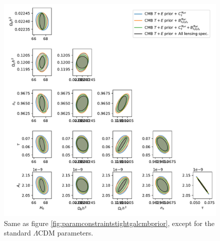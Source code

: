 \documentclass[11pt]{article} %
\begin{document}
\begin{figure}[h!]
    \centering
    \includegraphics[width=\textwidth]{paper/figures/param_constraints_lcdm_gal_cmb_prior.pdf}
    \caption{Same as figure \ref{fig:paramconstraintstightgalcmbprior}, except for the standard $\Lambda$CDM parameters.}
    \label{fig:paramconstraintsallgalcmbprior}
\end{figure}
\end{document}
